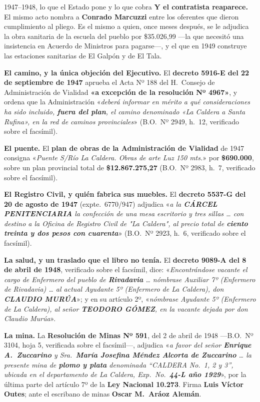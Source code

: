\begin{ficha}{1947--1948, lo que el Estado pone y lo que cobra}
\textbf{Y el contratista reaparece.} El mismo acto nombra a \textbf{Conrado Marcuzzi} entre
los oferentes que dieron cumplimiento al pliego. Es el mismo a quien, once meses después, se
le adjudica la obra sanitaria de la escuela del pueblo por \$35.026,99 ---la que necesitó una
insistencia en Acuerdo de Ministros para pagarse---, y el que en 1949 construye las estaciones
sanitarias de El Galpón y de El Tala.

\textbf{El camino, y la única objeción del Ejecutivo.} El \textbf{decreto 5916-E del 22 de
septiembre de 1947} aprueba el Acta Nº 188 del H.\ Consejo de Administración de Vialidad
\textbf{«a excepción de la resolución Nº 4967»}, y ordena que la Administración
«\textit{deberá informar en mérito a qué consideraciones ha sido incluido, \textbf{fuera del
plan}, el camino denominado «La Caldera a Santa Rufina», en la red de caminos
provinciales}» (B.O.\ Nº 2949, h.\ 12, verificado sobre el facsímil).

\textbf{El puente.} El \textbf{plan de obras de la Administración de Vialidad} de 1947
consigna «\textit{Puente S/Río La Caldera. Obras de arte Luz 150 mts.}» por
\textbf{\$690.000}, sobre un plan provincial total de \textbf{\$12.867.275,27}
(B.O.\ Nº 2983, h.\ 7, verificado sobre el facsímil).

\textbf{El Registro Civil, y quién fabrica sus muebles.} El \textbf{decreto 5537-G del 20 de
agosto de 1947} (expte.\ 6770/947) adjudica «\textit{a la \textbf{CÁRCEL PENITENCIARIA} la
confección de una mesa escritorio y tres sillas \ldots{} con destino a la Oficina de Registro
Civil de "La Caldera", al precio total de \textbf{ciento treinta y dos pesos con cuarenta}}»
(B.O.\ Nº 2923, h.\ 6, verificado sobre el facsímil).

\textbf{La salud, y un traslado que el libro no tenía.} El \textbf{decreto 9089-A del 8 de
abril de 1948}, verificado sobre el facsímil, dice: «\textit{Encontrándose vacante el cargo de
Enfermero del pueblo de \textbf{Rivadavia} \ldots{} nómbrase Auxiliar 7º (Enfermero de
Rivadavia) \ldots{} al actual Ayudante 5º (Enfermero de La Caldera), don \textbf{CLAUDIO
MURÚA}}»; y en su artículo 2º, «\textit{nómbrase Ayudante 5º (Enfermero de La Caldera), al
señor \textbf{TEODORO GÓMEZ}, en la vacante dejada por don Claudio Murúa}».

\textbf{La mina.} La \textbf{Resolución de Minas Nº 591}, del 2 de abril de 1948
---B.O.\ Nº 3104, hoja 5, verificada sobre el facsímil---, adjudica «\textit{a favor del señor
\textbf{Enrique A.\ Zuccarino} y Sra.\ \textbf{María Josefina Méndez Alcorta de Zuccarino}
\ldots{} la presente mina de \textbf{plomo y plata} denominada ``CALDERA No.\ 1, 2 y 3'',
ubicada en el departamento de La Caldera, Exp.\ No.\ \textbf{44-L año 1929}}», por la última
parte del artículo 7º de la \textbf{Ley Nacional 10.273}. Firma \textbf{Luis Víctor Outes};
ante el escribano de minas \textbf{Oscar M.\ Aráoz Alemán}.
\end{ficha}

